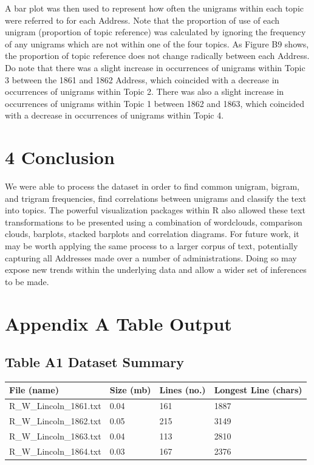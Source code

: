 \documentclass[]{article}
\begin{document}
A bar plot was then used to represent how often the unigrams within each
topic were referred to for each Address. Note that the proportion of use
of each unigram (proportion of topic reference) was calculated by
ignoring the frequency of any unigrams which are not within one of the
four topics. As Figure B9 shows, the proportion of topic reference does
not change radically between each Address. Do note that there was a
slight increase in occurrences of unigrams within Topic 3 between the
1861 and 1862 Address, which coincided with a decrease in occurrences of
unigrams within Topic 2. There was also a slight increase in occurrences
of unigrams within Topic 1 between 1862 and 1863, which coincided with a
decrease in occurrences of unigrams within Topic 4.

\section{4 Conclusion}\label{conclusion}

We were able to process the dataset in order to find common unigram,
bigram, and trigram frequencies, find correlations between unigrams and
classify the text into topics. The powerful visualization packages
within R also allowed these text transformations to be presented using a
combination of wordclouds, comparison clouds, barplots, stacked barplots
and correlation diagrams. For future work, it may be worth applying the
same process to a larger corpus of text, potentially capturing all
Addresses made over a number of administrations. Doing so may expose new
trends within the underlying data and allow a wider set of inferences to
be made.

\newpage

\section{Appendix A Table Output}\label{appendix-a-table-output}

\subsection{Table A1 Dataset Summary}\label{table-a1-dataset-summary}

\begin{longtable}[]{@{}llll@{}}
\toprule
File (name) & Size (mb) & Lines (no.) & Longest Line
(chars)\tabularnewline
\midrule
\endhead
R\_W\_Lincoln\_1861.txt & 0.04 & 161 & 1887\tabularnewline
R\_W\_Lincoln\_1862.txt & 0.05 & 215 & 3149\tabularnewline
R\_W\_Lincoln\_1863.txt & 0.04 & 113 & 2810\tabularnewline
R\_W\_Lincoln\_1864.txt & 0.03 & 167 & 2376\tabularnewline
\bottomrule
\end{longtable}
\end{document}
